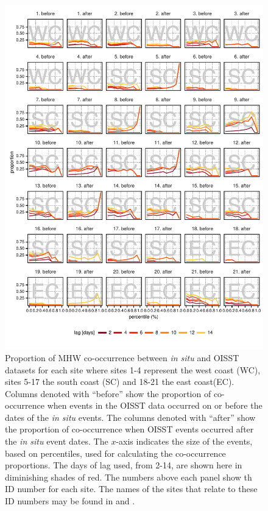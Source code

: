 \documentclass[a4paper,10pt,review]{elsarticle}
\begin{document}
\begin{figure}
\includegraphics[width=1.0\textwidth]{figure4.pdf}
\caption{Proportion of MHW co-occurrence between \emph{in situ} and OISST datasets for each site where sites 1-4 represent the west coast (WC), sites 5-17 the south coast (SC) and 18-21 the east coast(EC). Columns denoted with ``before'' show the proportion of co-occurrence when events in the OISST data occurred on or before the dates of the \emph{in situ} events. The columns denoted with ``after'' show the proportion of co-occurrence when OISST events occurred after the \emph{in situ} event dates. The $x$-axis indicates the size of the events, based on percentiles, used for calculating the co-occurrence proportions. The days of lag used, from 2-14, are shown here in diminishing shades of red. The numbers above each panel show th ID number for each site. The names of the sites that relate to these ID numbers may be found in  and .}
\label{fig:Figure4}
\end{figure}
\end{document}
